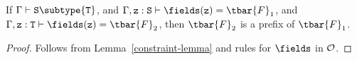 % 
% 
% 
% 
% 

\begin{lemma}
\label{fields-lemma} %
If   $\Gamma \vdash {\tt S} \subtype {\tt T}$,
and  $\Gamma, {\tt z}: {\tt S} \vdash \fields({\tt z}) = \tbar{F}_1$,
and  $\Gamma, {\tt z}: {\tt T} \vdash \fields({\tt z}) = \tbar{F}_2$,
then $\tbar{F}_2$ is a prefix of $\tbar{F}_1$.
\end{lemma}

\begin{proof}
Follows from Lemma~\ref{constraint-lemma} and rules for $\fields$  in ${\cal O}$.
\end{proof}

